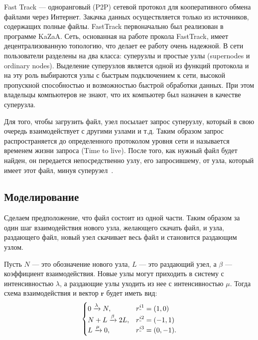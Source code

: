 \documentclass[floatfix,
showkeys,
twocolumn, nofootinbib, superscriptaddress, ]{revtex4-1}
\newcommand{\crd}[1]{\underline{\vphantom{j}{#1}}}
\begin{document}
  Fast Track --- одноранговый (P2P) сетевой протокол для
  кооперативного обмена файлами через Интернет. Закачка данных
  осуществляется только из источников, содержащих полные
  файлы. FastTrack первоначально был реализован в программе
  KaZaA. Сеть, основанная на работе прокола FastTrack, имеет
  децентрализованную топологию, что делает ее работу очень надежной. В
  сети пользователи разделены на два класса: суперузлы и простые узлы
  (supernodes и ordinary nodes). Выделение суперузлов является одной
  из функций протокола и на эту роль выбираются узлы с быстрым
  подключением к сети, высокой пропускной способностью и возможностью
  быстрой обработки данных. При этом владельцы компьютеров не знают,
  что их компьютер был назначен в качестве суперузла.

  Для того, чтобы загрузить файл, узел посылает запрос суперузлу,
  который в свою очередь взаимодействует с другими узлами и т.д. Таким
  образом запрос распространяется до определенного протоколом уровня
  сети и называется временем жизни запроса (Time to live). После того,
  как нужный файл будет найден, он передается непосредственно узлу,
  его запросившему, от узла, который имеет этот файл, минуя
  суперузел~\cite{ft1, ft2}.

  \subsection{Моделирование}

  Сделаем предположение, что файл состоит из одной части. Таким
  образом за один шаг взаимодействия нового узла, желающего скачать
  файл, и узла, раздающего файл, новый узел скачивает весь файл и
  становится раздающим узлом.

  Пусть $N$ --- это обозначение нового узла, $L$ --- это раздающий
  узел, а $\beta $ --- коэффициент взаимодействия. Новые узлы могут
  приходить в систему с интенсивностью $\lambda $, а раздающие узлы
  уходить из нее с интенсивностью $\mu$. Тогда схема взаимодействия и
  вектор $\mathbf r$ будет иметь вид:
\begin{equation} 
  \label{ft:1}
  \begin{cases}
    0 \xrightarrow{\lambda } N, & r^{\crd{i}1}=(1,0) \\
    N+L \xrightarrow{\beta } 2L, & r^{\crd{i}2}=(-1,1)\\
    L \xrightarrow{\mu} 0, & r^{\crd{i}3}=(0,-1).
  \end{cases}
\end{equation}
\end{document}
